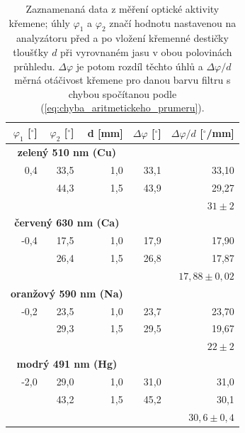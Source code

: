 \documentclass[english]{article}
\begin{document}
		\begin{table}[htbp]
		  \centering
		    \begin{tabular}{rrrrr}
		    \toprule
		    \boldmath{}\textbf{$\varphi_1$ [$^\circ$]}\unboldmath{} & \boldmath{}\textbf{$\varphi_2$ [$^\circ$]}\unboldmath{} & \textbf{d [mm]} & \boldmath{}\textbf{$\Delta \varphi$ [$^\circ$]}\unboldmath{} & \boldmath{}\textbf{$\Delta \varphi / d$  [$^\circ$/mm]}\unboldmath{} \\
		    \midrule
		    \multicolumn{3}{c}{\textbf{zelený 510 nm (Cu)}} &       &  \\
		    0,4   & 33,5  & 1,0   & 33,1  & 33,10 \\
		          & 44,3  & 1,5   & 43,9  & 29,27 \\
		          &       &       &       & \textbf{$31\pm 2$} \\
		    \multicolumn{3}{c}{\textbf{červený 630 nm (Ca)}} &       &  \\
		    -0,4  & 17,5  & 1,0   & 17,9  & 17,90 \\
		          & 26,4  & 1,5   & 26,8  & 17,87 \\
		          &       &       &       & \textbf{$17,88\pm 0,02$} \\
		    \multicolumn{3}{c}{\textbf{oranžový 590 nm (Na)}} &       &  \\
		    -0,2  & 23,5  & 1,0   & 23,7  & 23,70 \\
		          & 29,3  & 1,5   & 29,5  & 19,67 \\
		          &       &       &       & \textbf{$22\pm 2$} \\
		    \multicolumn{3}{c}{\textbf{modrý 491 nm (Hg)}} &       &  \\
		    -2,0  & 29,0  & 1,0   & 31,0  & 31,0 \\
		          & 43,2  & 1,5   & 45,2  & 30,1 \\
		          &       &       &       & \textbf{$30,6\pm 0,4$} \\
		    \bottomrule
		    \end{tabular}%
		  \caption{Zaznamenaná data z měření optické aktivity křemene; úhly $\varphi_1$ a $\varphi_2$ značí hodnotu nastavenou na analyzátoru před a po vložení křemenné destičky tloušťky $d$ při vyrovnaném jasu v obou polovinách průhledu. $\Delta \varphi$ je potom rozdíl těchto úhlů a $\Delta \varphi / d$ měrná otáčivost křemene pro danou barvu filtru s chybou spočítanou podle (\ref{eq:chyba_aritmetickeho_prumeru}).  }
		  \label{tab:kremik}%
		\end{table}%
		
\end{document}
